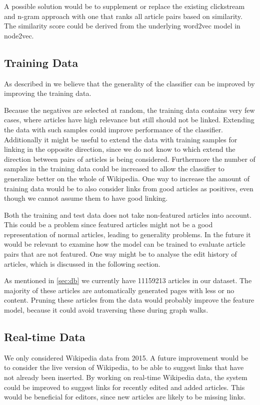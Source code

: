 A possible solution would be to supplement or replace the existing clickstream and n-gram approach with one that ranks all article pairs based on similarity. The similarity score could be derived from the underlying word2vec model in node2vec.

\subsection{Training Data}
As described in  we believe that the generality of the classifier can be improved by improving the training data.

Because the negatives are selected at random, the training data contains very few cases, where articles have high relevance but still should not be linked. Extending the data with such samples could improve performance of the classifier. Additionally it might be useful to extend the data with training samples for linking in the opposite direction, since we do not know to which extend the direction between pairs of articles is being considered. Furthermore the number of samples in the training data could be increased to allow the classifier to generalize better on the whole of Wikipedia. One way to increase the amount of training data would be to also consider links from good articles as positives, even though we cannot assume them to have good linking.

Both the training and test data does not take non-featured articles into account. This could be a problem since featured articles might not be a good representation of normal articles, leading to generality problems. In the future it would be relevant to examine how the model can be trained to evaluate article pairs that are not featured. One way might be to analyse the edit history of articles, which is discussed in the following section. %

As mentioned in \cref{sec:db} we currently have \num{11159213} articles in our dataset. The majority of these articles are automatically generated pages with less or no content. Pruning these articles from the data would probably improve the feature model, because it could avoid traversing these during graph walks.

\subsection{Real-time Data}
We only considered Wikipedia data from 2015. A future improvement would be to consider the live version of Wikipedia, to be able to suggest links that have not already been inserted.
By working on real-time Wikipedia data, the system could be improved to suggest links for recently edited and added articles. This would be beneficial for editors, since new articles are likely to be missing links.

